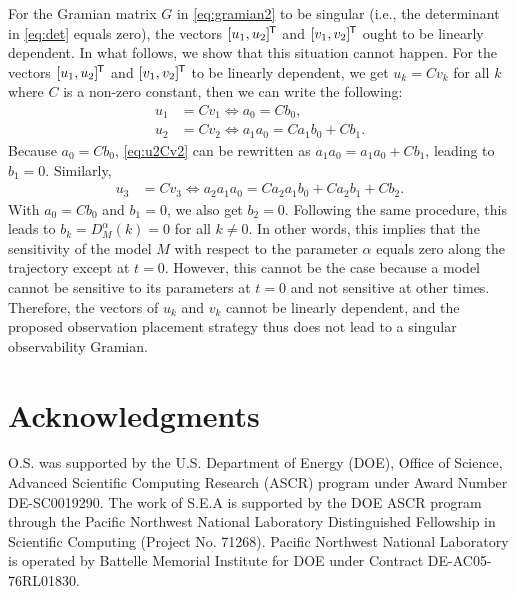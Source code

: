 \documentclass{article}
\newcommand*{\tran}{^{\mkern-1.5mu\mathsf{T}}}
\begin{document}
For the Gramian matrix $G$ in \cref{eq:gramian2} to be singular (i.e., the determinant in \cref{eq:det} equals zero), the vectors $[u_1,u_2]\tran$ and $[v_1,v_2]\tran$ ought to be linearly dependent. In what follows, we show that this situation cannot happen. For the vectors $[u_1,u_2]\tran$ and $[v_1,v_2]\tran$ to be linearly dependent, we get $u_k=C v_k$ for all $k$ where $C$ is a non-zero constant, then we can write the following:
\begin{align}
    u_1 &= C v_1 \Longleftrightarrow a_0 = C b_0, \\
    u_2 &=  C v_2 \Longleftrightarrow a_1 a_0 = Ca_1 b_0 + C b_1. \label{eq:u2Cv2}
\end{align}
Because $a_0 = C b_0$, \cref{eq:u2Cv2} can be rewritten as  $a_1 a_0 = a_1 a_0 + C b_1$, leading to $b_1 = 0$. Similarly, 
\begin{align}
    u_3 &= C v_3  \Longleftrightarrow a_2 a_1 a_0 = Ca_2 a_1 b_0 + C a_2 b_1 + C b_2. 
\end{align}
With $a_0 = C b_0$ and  $b_1 = 0$, we also get $b_2 = 0$. Following the same procedure, this leads to $b_k=D_M^{\alpha}(k)=0$ for all $k\neq 0$. In other words, this implies that the sensitivity of the model $M$ with respect to the parameter $\alpha$ equals zero along the trajectory except at $t=0$. However, this cannot be the case because a model cannot be sensitive to its parameters at $t=0$ and not sensitive at other times. Therefore, the vectors of $u_k$ and $v_k$ cannot be linearly dependent, and the proposed observation placement strategy thus does not lead to a singular observability Gramian.

\section*{Acknowledgments}
O.S. was supported by the U.S. Department of Energy (DOE), Office of Science, Advanced Scientific Computing Research (ASCR) program under Award Number DE-SC0019290. The work of S.E.A is supported by the DOE ASCR program through the Pacific Northwest National Laboratory Distinguished Fellowship in Scientific Computing (Project No. 71268). Pacific Northwest National Laboratory is operated by Battelle Memorial Institute for DOE under Contract DE-AC05-76RL01830.
\end{document}
